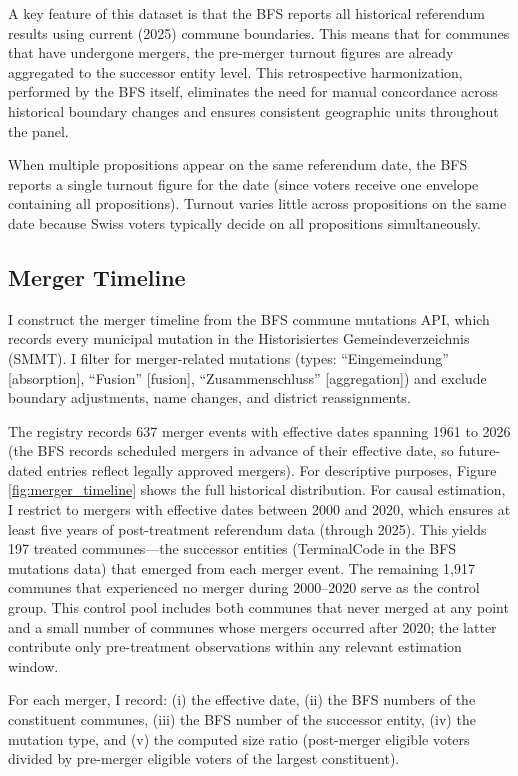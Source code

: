 \documentclass[12pt]{article}
\begin{document}
A key feature of this dataset is that the BFS reports all historical referendum results using current (2025) commune boundaries. This means that for communes that have undergone mergers, the pre-merger turnout figures are already aggregated to the successor entity level. This retrospective harmonization, performed by the BFS itself, eliminates the need for manual concordance across historical boundary changes and ensures consistent geographic units throughout the panel.

When multiple propositions appear on the same referendum date, the BFS reports a single turnout figure for the date (since voters receive one envelope containing all propositions). Turnout varies little across propositions on the same date because Swiss voters typically decide on all propositions simultaneously.

\subsection{Merger Timeline}

I construct the merger timeline from the BFS commune mutations API, which records every municipal mutation in the Historisiertes Gemeindeverzeichnis (SMMT). I filter for merger-related mutations (types: ``Eingemeindung'' [absorption], ``Fusion'' [fusion], ``Zusammenschluss'' [aggregation]) and exclude boundary adjustments, name changes, and district reassignments.

The registry records 637 merger events with effective dates spanning 1961 to 2026 (the BFS records scheduled mergers in advance of their effective date, so future-dated entries reflect legally approved mergers). For descriptive purposes, Figure \ref{fig:merger_timeline} shows the full historical distribution. For causal estimation, I restrict to mergers with effective dates between 2000 and 2020, which ensures at least five years of post-treatment referendum data (through 2025). This yields 197 treated communes---the successor entities (TerminalCode in the BFS mutations data) that emerged from each merger event. The remaining 1,917 communes that experienced no merger during 2000--2020 serve as the control group. This control pool includes both communes that never merged at any point and a small number of communes whose mergers occurred after 2020; the latter contribute only pre-treatment observations within any relevant estimation window.

For each merger, I record: (i) the effective date, (ii) the BFS numbers of the constituent communes, (iii) the BFS number of the successor entity, (iv) the mutation type, and (v) the computed size ratio (post-merger eligible voters divided by pre-merger eligible voters of the largest constituent).
\end{document}
